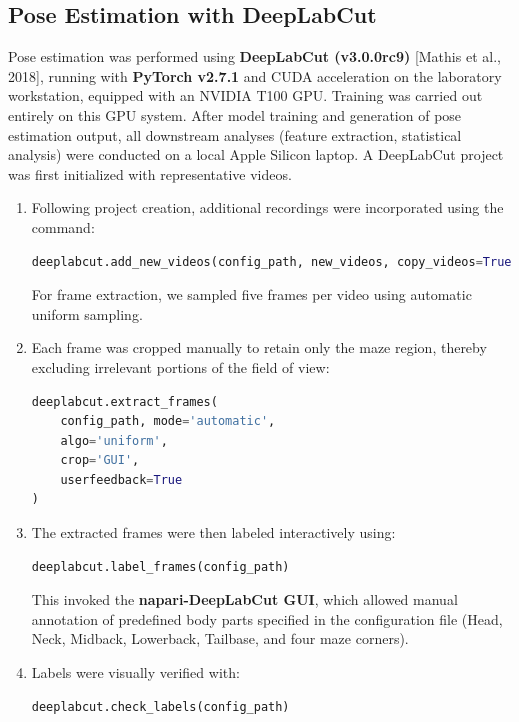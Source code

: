 \subsection{Pose Estimation with DeepLabCut}
Pose estimation was performed using \textbf{DeepLabCut (v3.0.0rc9)} [Mathis et al., 2018], running with \textbf{PyTorch v2.7.1} and CUDA acceleration on the laboratory workstation, equipped with an NVIDIA T100 GPU. Training was carried out entirely on this GPU system. After model training and generation of pose estimation output, all downstream analyses (feature extraction, statistical analysis) were conducted on a local Apple Silicon laptop. A DeepLabCut project was first initialized with representative videos.\\
\begin{enumerate}[label=\alph*.]
    \item Following project creation, additional recordings were incorporated using the command:
\begin{lstlisting}[language=Python]
deeplabcut.add_new_videos(config_path, new_videos, copy_videos=True, extract_frames=False)
\end{lstlisting}
For frame extraction, we sampled five frames per video using automatic uniform sampling. 
    \item Each frame was cropped manually to retain only the maze region, thereby excluding irrelevant portions of the field of view:
\begin{lstlisting}[language=Python]
deeplabcut.extract_frames(
    config_path, mode='automatic',
    algo='uniform',
    crop='GUI',
    userfeedback=True
)
\end{lstlisting}
    \item The extracted frames were then labeled interactively using:
\begin{lstlisting}[language=Python]
deeplabcut.label_frames(config_path)
\end{lstlisting}
This invoked the \textbf{napari-DeepLabCut GUI}, which allowed manual annotation of predefined body parts specified in the configuration file (Head, Neck, Midback, Lowerback, Tailbase, and four maze corners). 
    \item Labels were visually verified with:
\begin{lstlisting}[language=Python]
deeplabcut.check_labels(config_path)
\end{lstlisting}
\begin{figure}[htbp]
    \centering

\end{figure}
\end{enumerate}
